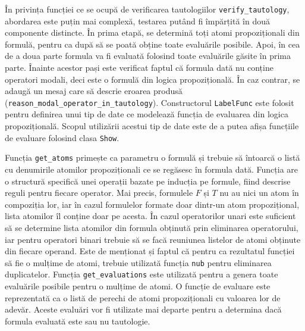 \documentclass[12pt, openany]{book}
\begin{document}
            \par{}
                În privința funcției ce se ocupă de verificarea tautologiilor \texttt{verify\_tautology}, abordarea este 
                puțin mai complexă, testarea putând fi împărțită în două componente distincte. În prima etapă, se 
                determină toți atomi propoziționali din formulă, pentru ca după să se poată obține toate evaluările 
                posibile. Apoi, în cea de a doua parte formula va fi evaluată folosind toate evaluările găsite în prima 
                parte. Înainte acestor pași este verificat faptul că formula dată nu conține operatori modali, deci este 
                o formulă din logica propozițională. În caz contrar, se adaugă un mesaj care să descrie eroarea produsă 
                (\texttt{reason\_modal\_operator\_in\_tautology}). Constructorul \texttt{LabelFunc} este folosit pentru 
                definirea unui tip de date ce modelează funcția de evaluarea din logica propozițională. Scopul 
                utilizării acestui tip de date este de a putea afișa funcțiile de evaluare folosind clasa \texttt{Show}.

            \par{}
                Funcția \texttt{get\_atoms} primește ca parametru o formulă și trebuie să întoarcă o listă cu 
                denumirile atomilor propoziționali ce se regăsesc în formula dată. Funcția are o structură specifică 
                unei operații bazate pe inducția pe formule, fiind descrise reguli pentru fiecare operator. Mai precis, 
                formulele $F$ și $T$ nu au nici un atom în compoziția lor, iar în cazul formulelor formate doar dintr-un 
                atom propozițional, lista atomilor îl conține doar pe acesta. În cazul operatorilor unari este suficient 
                să se determine lista atomilor din formula obținută prin eliminarea operatorului, iar pentru operatori 
                binari trebuie să se facă reuniunea listelor de atomi obținute din fiecare operand. Este de menționat și 
                faptul că pentru ca rezultatul funcției să fie o mulțime de atomi, trebuie utilizată funcția
                \texttt{nub} pentru eliminarea duplicatelor. Funcția \texttt{get\_evaluations} este utilizată pentru a 
                genera toate evaluările posibile pentru o mulțime de atomi. O funcție de evaluare este reprezentată ca o 
                listă de perechi de atomi propoziționali cu valoarea lor de adevăr. Aceste evaluări vor fi utilizate mai 
                departe pentru a determina dacă formula evaluată este sau nu tautologie.
\end{document}
